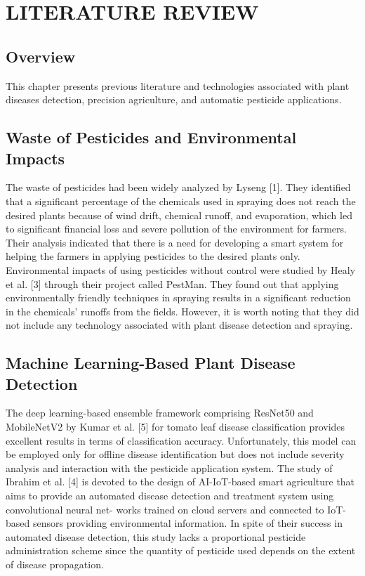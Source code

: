 \documentclass[12pt,a4paper,oneside]{report}
\begin{document}
\chapter{LITERATURE REVIEW}

\section{Overview}

This chapter presents previous literature and technologies associated with plant diseases detection, precision agriculture, and automatic pesticide applications.

\section{Waste of Pesticides and Environmental Impacts}

The waste of pesticides had been widely analyzed by Lyseng [1]. They identified that a significant percentage of the chemicals used in spraying does not reach the desired plants because of wind drift, chemical runoff, and evaporation, which led to significant financial loss and severe pollution of the environment for farmers. Their analysis indicated that there is a need for developing a smart system for helping the farmers in applying pesticides to the desired plants only.
Environmental impacts of using pesticides without control were studied by Healy et al. [3] through their project called PestMan. They found out that applying environmentally friendly techniques in spraying results in a significant reduction in the chemicals' runoffs from the fields. However, it is worth noting that they did not include any technology associated with plant disease detection and spraying.

\section{Machine Learning-Based Plant Disease Detection}

The deep learning-based ensemble framework comprising ResNet50 and MobileNetV2 by Kumar
et al. [5] for tomato leaf disease classification provides excellent results in terms of classification accuracy. Unfortunately, this model can be employed only for offline disease identification but does not
include severity analysis and interaction with the pesticide application system.
The study of Ibrahim et al. [4] is devoted to the design of AI-IoT-based smart agriculture that aims
to provide an automated disease detection and treatment system using convolutional neural net-
works trained on cloud servers and connected to IoT-based sensors providing environmental
information. In spite of their success in automated disease detection, this study lacks a proportional
pesticide administration scheme since the quantity of pesticide used depends on the extent of
disease propagation.
\end{document}
